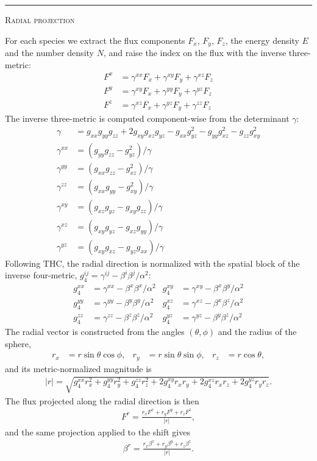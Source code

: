 \documentclass{article}
\newcommand{\step}[1]{%
  \par\medskip\noindent
  {\color{stepfg}\rule[-0.15ex]{2pt}{1.5ex}\hspace{0.5em}\scshape #1}%
  \hspace{0.75em}\ignorespaces}
\begin{document}
\step{Radial projection} For each species we extract the flux components $F_x$,
$F_y$, $F_z$, the energy density $E$ and the number density $N$, and raise the index
on the flux with the inverse three-metric:
\begin{align}
  F^x &= \gamma^{xx}F_x+\gamma^{xy}F_y+\gamma^{xz}F_z\\
  F^y &= \gamma^{xy}F_x+\gamma^{yy}F_y+\gamma^{yz}F_z\\
  F^z &= \gamma^{xz}F_x+\gamma^{yz}F_y+\gamma^{zz}F_z
\end{align}
The inverse three-metric is computed component-wise from the determinant $\gamma$:
\begin{align}
  \gamma &= g_{xx}g_{yy}g_{zz}+2g_{xy}g_{xz}g_{yz}-g_{xx}g_{yz}^2-g_{yy}g_{xz}^2-g_{zz}g_{xy}^2\\
  \gamma^{xx} &= \left(g_{yy}g_{zz}-g_{yz}^2\right)/\gamma\\
  \gamma^{yy} &= \left(g_{xx}g_{zz}-g_{xz}^2\right)/\gamma\\
  \gamma^{zz} &= \left(g_{xx}g_{yy}-g_{xy}^2\right)/\gamma\\
  \gamma^{xy} &= \left(g_{xz}g_{yz}-g_{xy}g_{zz}\right)/\gamma\\
  \gamma^{xz} &= \left(g_{xy}g_{yz}-g_{xz}g_{yy}\right)/\gamma\\
  \gamma^{yz} &= \left(g_{xy}g_{xz}-g_{yz}g_{xx}\right)/\gamma
\end{align}
Following THC, the radial direction is normalized with the spatial block of the
inverse four-metric, $g^{ij}_4=\gamma^{ij}-\beta^i\beta^j/\alpha^2$:
\begin{align}
  g^{xx}_4&=\gamma^{xx}-\beta^x\beta^x / \alpha^2 &
  g^{xy}_4&=\gamma^{xy}-\beta^x\beta^y / \alpha^2\\
  g^{yy}_4&=\gamma^{yy}-\beta^y\beta^y / \alpha^2 &
  g^{xz}_4&=\gamma^{xz}-\beta^x\beta^z / \alpha^2\\
  g^{zz}_4&=\gamma^{zz}-\beta^z\beta^z / \alpha^2 &
  g^{yz}_4&=\gamma^{yz}-\beta^y\beta^z / \alpha^2
\end{align}
The radial vector is constructed from the angles $(\theta,\phi)$ and the radius of
the sphere,
\begin{align}
  r_x &= r\sin{\theta}\cos{\phi}, &
  r_y &= r\sin{\theta}\sin{\phi}, &
  r_z &= r\cos{\theta},
\end{align}
and its metric-normalized magnitude is
\begin{align}
  |r|=\sqrt{g^{xx}_4r_x^2+g^{yy}_4r_y^2+g^{zz}_4r_z^2+2g^{xy}_4r_{x}r_{y}+2g^{xz}_4r_{x}r_{z}+2g^{yz}_4r_{y}r_{z}}.
\end{align}
The flux projected along the radial direction is then
\begin{align}
  F^r = \frac{r_{x}F^x+r_{y}F^y+r_{z}F^z}{|r|},
\end{align}
and the same projection applied to the shift gives
\begin{align}
  \beta^r = \frac{r_{x}\beta^{x}+r_{y}\beta^{y}+r_{z}\beta^{z}}{|r|}.
\end{align}
\end{document}
